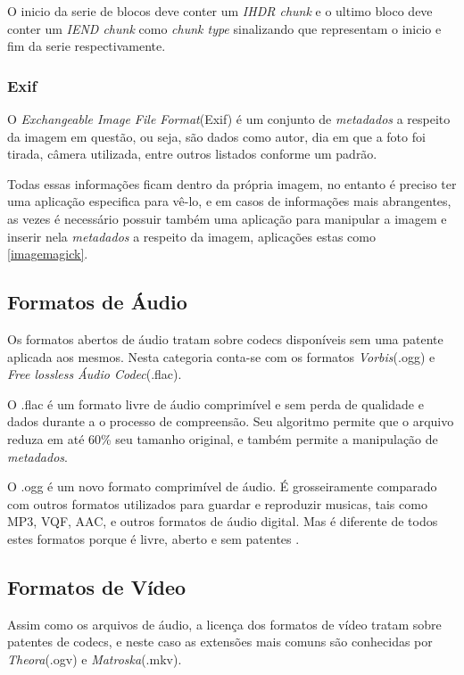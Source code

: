 O inicio da serie de blocos deve conter um \textit{IHDR chunk} e o ultimo bloco deve conter um \textit{IEND chunk} como \textit{chunk type} sinalizando que representam o inicio e fim da serie respectivamente.

\subsubsection{Exif}

O \textit{Exchangeable Image File Format}(Exif) é um conjunto de \textit{metadados} a respeito da imagem em questão, ou seja, são dados como autor, dia em que a foto foi tirada, câmera utilizada, entre outros listados conforme um padrão.

Todas essas informações ficam dentro da própria imagem, no entanto é preciso ter uma aplicação especifica para vê-lo, e em casos de informações mais abrangentes, as vezes é necessário possuir também uma aplicação para manipular a imagem e inserir nela \textit{metadados} a respeito da imagem, aplicações estas como \ref{imagemagick}.

\subsection{Formatos de Áudio}

Os formatos abertos de áudio tratam sobre codecs disponíveis sem uma patente aplicada aos mesmos. Nesta categoria conta-se com os formatos \textit{Vorbis}(.ogg) e \textit{Free lossless Áudio Codec}(.flac).

O .flac é um formato livre de áudio comprimível e sem perda de qualidade e dados durante a o processo de compreensão. Seu algoritmo permite que o arquivo reduza em até 60\% seu tamanho original, e também permite a manipulação de \textit{metadados}.

O .ogg é um novo formato comprimível de áudio. 
É grosseiramente comparado com outros formatos utilizados para guardar e reproduzir musicas, tais como MP3, VQF, AAC, e outros formatos de áudio digital. Mas é diferente de todos estes formatos porque é livre, aberto e sem patentes \cite{XIPH}.

\subsection{Formatos de Vídeo}

Assim como os arquivos de áudio, a licença dos formatos de vídeo tratam sobre patentes de codecs, e neste caso as extensões mais comuns são conhecidas por \textit{Theora}(.ogv) e \textit{Matroska}(.mkv).

